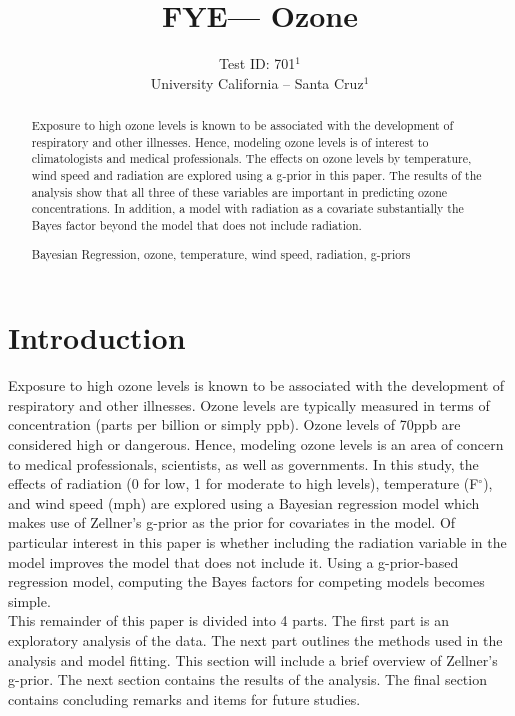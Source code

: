 \documentclass{../../tex_template/asaproc}
\title{FYE--- Ozone}
\author{
  Test ID: 701$^1$\\
  University California -- Santa Cruz$^1$\\
}
\begin{document}
\maketitle
\begin{abstract}
Exposure to high ozone levels is known to be associated with the development
of respiratory and other illnesses. Hence, modeling ozone levels is of interest
to climatologists and medical professionals. The effects on ozone levels by
temperature, wind speed and radiation are explored using a g-prior in this 
paper. The results of the analysis show that all three of these variables are
important in predicting ozone concentrations. In addition, a model with
radiation as a covariate substantially the Bayes factor beyond the model
that does not include radiation.

\begin{keywords}
Bayesian Regression, ozone, temperature, wind speed, radiation, g-priors
\end{keywords}
\end{abstract}

\section{Introduction}
Exposure to high ozone levels is known to be associated with the development of
respiratory and other illnesses. Ozone levels are typically measured in terms
of concentration (parts per billion or simply ppb). Ozone levels of 70ppb are
considered high or dangerous. Hence, modeling ozone levels is an area of 
concern to medical professionals, scientists, as well as governments. In this
study, the effects of radiation (0 for low, 1 for moderate to high levels), 
temperature (F$^\circ$), and wind speed (mph) are explored using a Bayesian
regression model which makes use of Zellner's g-prior as the prior for covariates
in the model. Of particular interest in this paper is whether including the 
radiation variable in the model improves the model that does not include it.
Using a g-prior-based regression model, computing the Bayes factors for competing
models becomes simple.\\

This remainder of this paper is divided into 4 parts. The first part is an 
exploratory analysis of the data. The next part outlines the methods used in
the analysis and model fitting. This section will include a brief overview
of Zellner's g-prior. The next section contains the results of the analysis.
The final section contains concluding remarks and items for future studies.
\end{document}
